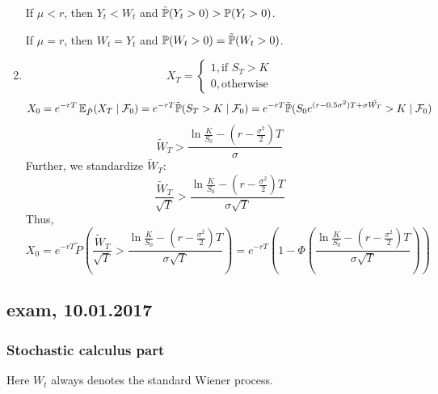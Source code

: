 \documentclass[12pt, a4paper]{article}
\newcommand{\cF}{\mathcal{F}}
\begin{document}
\begin{enumerate}
If $\mu<r$, then $Y_t<W_t$ and $\tilde \P(Y_t>0)>\P(Y_t>0)$.

If $\mu=r$, then $W_t=Y_t$ and $\P(W_t>0)=\tilde \P(W_t>0)$.


\item
\[
X_T=\begin{cases}
1, \text{if } S_T>K\\
0, \text{otherwise}
\end{cases}
\]
\[
X_0=e^{-rT}\E_{\tilde P}(X_T \mid \cF_0)=e^{-rT}\tilde \P(S_T>K \mid \cF_0)=e^{-rT}\tilde \P(S_0e^{(r-0.5\sigma^2)T+\sigma \tilde{W_T}}>K \mid \cF_0)
\]
\[
\tilde W_T>\frac{\ln\frac{K}{S_0} -\left(r-\frac{\sigma^2}{2}\right)T}{\sigma}
\]
Further, we standardize $\tilde W_T$:
\[
\frac{\tilde W_T}{\sqrt T}>\frac{\ln\frac{K}{S_0} -\left(r-\frac{\sigma^2}{2}\right)T}{\sigma\sqrt T}
\]
Thus,
\[
X_0=e^{-rT}\tilde P\left(\frac{\tilde W_T}{\sqrt T}>\frac{\ln\frac{K}{S_0} -\left(r-\frac{\sigma^2}{2}\right)T}{\sigma\sqrt T}\right)=e^{-rT}\left(1-\Phi\left(\frac{\ln\frac{K}{S_0} -\left(r-\frac{\sigma^2}{2}\right)T}{\sigma\sqrt T}\right)\right)
\]

\end{enumerate}



\subsection{exam, 10.01.2017}


\subsubsection*{Stochastic calculus part}

Here $W_t$ always denotes the standard Wiener process.

\vspace{10pt}
\end{document}
